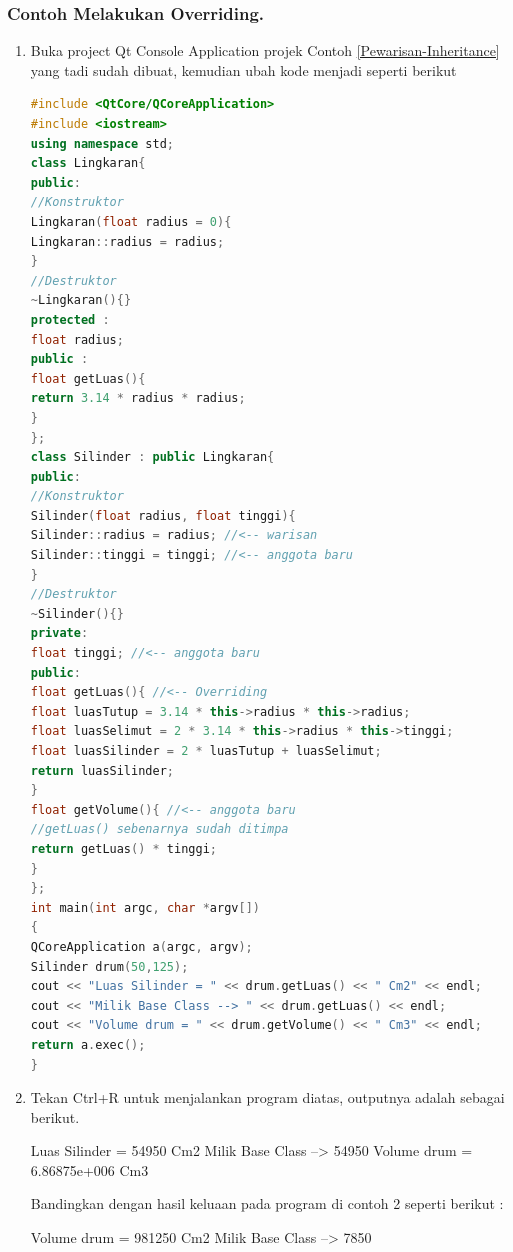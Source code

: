 \subsubsection*{Contoh Melakukan Overriding.}
\begin{enumerate}
	
	
	\item Buka project Qt Console Application projek Contoh \ref{Pewarisan-Inheritance} yang tadi sudah
	dibuat, kemudian ubah kode menjadi seperti berikut
	
\begin{lstlisting}[language=c++, caption=Melakukan Overriding]
#include <QtCore/QCoreApplication>
#include <iostream>
using namespace std;
class Lingkaran{
public:
//Konstruktor
Lingkaran(float radius = 0){
Lingkaran::radius = radius;
}
//Destruktor
~Lingkaran(){}
protected :
float radius;
public :
float getLuas(){
return 3.14 * radius * radius;
}
};
class Silinder : public Lingkaran{
public:
//Konstruktor
Silinder(float radius, float tinggi){
Silinder::radius = radius; //<-- warisan
Silinder::tinggi = tinggi; //<-- anggota baru
}
//Destruktor
~Silinder(){}
private:
float tinggi; //<-- anggota baru
public:
float getLuas(){ //<-- Overriding
float luasTutup = 3.14 * this->radius * this->radius;
float luasSelimut = 2 * 3.14 * this->radius * this->tinggi;
float luasSilinder = 2 * luasTutup + luasSelimut;
return luasSilinder;
}
float getVolume(){ //<-- anggota baru
//getLuas() sebenarnya sudah ditimpa
return getLuas() * tinggi;
}
};
int main(int argc, char *argv[])
{
QCoreApplication a(argc, argv);
Silinder drum(50,125);
cout << "Luas Silinder = " << drum.getLuas() << " Cm2" << endl;
cout << "Milik Base Class --> " << drum.getLuas() << endl;
cout << "Volume drum = " << drum.getVolume() << " Cm3" << endl;
return a.exec();
}
\end{lstlisting}
	
	
		\item
		Tekan Ctrl+R untuk menjalankan program diatas, outputnya adalah
		sebagai berikut.

	
	\begin{lcverbatim}
	Luas Silinder = 54950 Cm2
	Milik Base Class --> 54950
	Volume drum = 6.86875e+006 Cm3
	\end{lcverbatim}
	
	Bandingkan dengan hasil keluaan pada program di contoh 2 seperti berikut
	:
	
	\begin{lcverbatim}
	Volume drum = 981250 Cm2
	Milik Base Class –> 7850
	\end{lcverbatim}
\end{enumerate}


